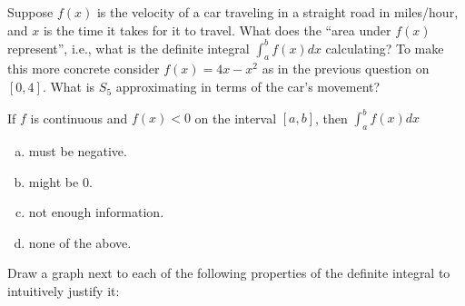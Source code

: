 \documentclass[answers]{exam}
\begin{document}
\begin{questions}
		
		\question Suppose $f(x)$ is the velocity of a car traveling in a straight road in miles/hour, and $x$ is the time it takes for it to travel. What does the ``area under $f(x)$ represent'', i.e., what is the definite integral $\displaystyle \int_a^b f(x) dx$ calculating? To make this more concrete consider $f(x) = 4x-x^2$ as in the previous question on $[0, 4]$. What is $S_5$ approximating in terms of the car's movement? 
		
		
	\vspace{2in}	
		
		\question If $f$ is continuous and $f(x) < 0$ on the interval $[a, b]$, then $\displaystyle \int_a^b f(x) dx$
		\begin{enumerate}[(a)]
			\item must be negative.
			\item might be 0.
			\item not enough information.
			\item none of the above.
		\end{enumerate}
	
	
\newpage

%		
%		
		
		\question Draw a graph next to each of the following properties of the definite integral to intuitively justify it:
		\begin{enumerate}[(1)]
			

\end{enumerate}
\end{questions}
\end{document}
